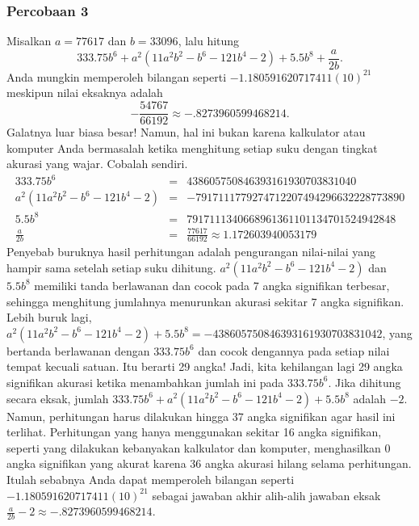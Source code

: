 \subsubsection{Percobaan 3}

Misalkan $a=77617$ dan $b=33096$, lalu hitung
\[
333.75b^{6}+a^{2}(11a^{2}b^{2}-b^{6}-121b^{4}-2)+5.5b^{8}+\frac{a}{2b}.
\]
Anda mungkin memperoleh bilangan seperti $-1.180591620717411(10)^{21}$
meskipun nilai eksaknya adalah
\[
-\frac{54767}{66192}\approx-.8273960599468214.
\]
Galatnya luar biasa besar! Namun, hal ini bukan karena kalkulator
atau komputer Anda bermasalah ketika menghitung setiap suku dengan
tingkat akurasi yang wajar. Cobalah sendiri.
\begin{eqnarray*}
333.75b^{6} & = & 438605750846393161930703831040\\
a^{2}(11a^{2}b^{2}-b^{6}-121b^{4}-2) & = & -7917111779274712207494296632228773890\\
5.5b^{8} & = & 7917111340668961361101134701524942848\\
\frac{a}{2b} & = & \frac{77617}{66192}\approx1.172603940053179
\end{eqnarray*}
Penyebab buruknya hasil perhitungan adalah pengurangan nilai-nilai
yang hampir sama setelah setiap suku dihitung. $a^{2}(11a^{2}b^{2}-b^{6}-121b^{4}-2)$
dan $5.5b^{8}$ memiliki tanda berlawanan dan cocok pada 7 angka signifikan
terbesar, sehingga menghitung jumlahnya menurunkan akurasi sekitar
7 angka signifikan. Lebih buruk lagi, $a^{2}(11a^{2}b^{2}-b^{6}-121b^{4}-2)+5.5b^{8}=-438605750846393161930703831042$,
yang bertanda berlawanan dengan $333.75b^{6}$ dan cocok dengannya
pada setiap nilai tempat kecuali satuan. Itu berarti 29 angka! Jadi,
kita kehilangan lagi 29 angka signifikan akurasi ketika menambahkan
jumlah ini pada $333.75b^{6}$. Jika dihitung secara eksak, jumlah
$333.75b^{6}+a^{2}(11a^{2}b^{2}-b^{6}-121b^{4}-2)+5.5b^{8}$ adalah
$-2$. Namun, perhitungan harus dilakukan hingga 37 angka signifikan
agar hasil ini terlihat. Perhitungan yang hanya menggunakan sekitar
16 angka signifikan, seperti yang dilakukan kebanyakan kalkulator
dan komputer, menghasilkan 0 angka signifikan yang akurat karena 36
angka akurasi hilang selama perhitungan. Itulah sebabnya Anda dapat
memperoleh bilangan seperti $-1.180591620717411(10)^{21}$ sebagai
jawaban akhir alih-alih jawaban eksak $\frac{a}{2b}-2\approx-.8273960599468214$.


